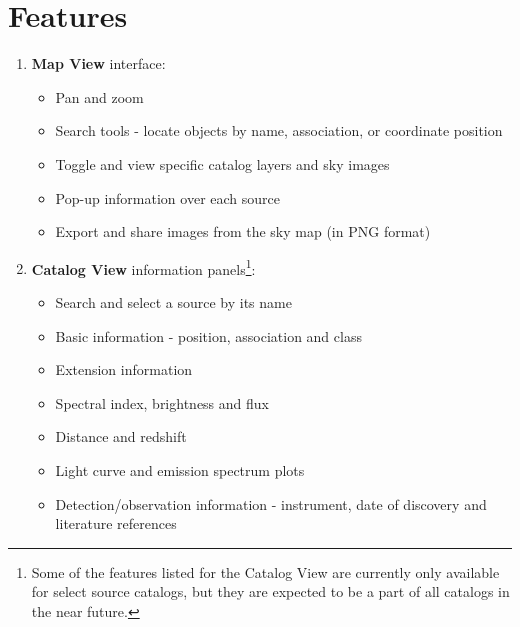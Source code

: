\renewcommand{\thefootnote}{\fnsymbol{footnote}}

\section{Features}

\begin{enumerate}

\item \textbf{Map View} interface:

\begin{itemize}
\item Pan and zoom
\item Search tools - locate objects by name, association, or coordinate position
\item Toggle and view specific catalog layers and sky images
\item Pop-up information over each source
\item Export and share images from the sky map (in PNG format)
\end{itemize}

\item \textbf{Catalog View} information panels\footnote[1]{Some of the features listed for the Catalog View are currently only available for select source catalogs, but they are expected to be a part of all catalogs in the near future.}:

\begin{itemize}

\item Search and select a source by its name
\item Basic information - position, association and class
\item Extension information
\item Spectral index, brightness and flux
\item Distance and redshift
\item Light curve and emission spectrum plots
\item Detection/observation information - instrument, date of discovery and literature references

\end{itemize}

\end{enumerate}

